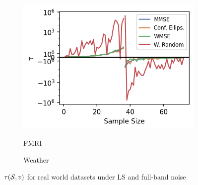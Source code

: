 \begin{figure}
    \centering
    \begin{subfigure}{0.3\columnwidth}
    \resizebox{\width}{0.62\columnwidth}
    {\includegraphics[width=\columnwidth]{figures/proj1/plots/LS_threshold_real/fmri_subsample_500_367_bandwidth_36_thresholds_LS.png}}
    \caption{FMRI} 
    \label{snr_FMRI}
    \end{subfigure}
    \begin{subfigure}{0.3\columnwidth}
    \caption{Weather}%
    \label{snr_Weather}%
    \end{subfigure}
    \caption{$\tau(\mathcal{S},v)$ for real world datasets under LS and full-band noise}
\label{LS_SNR_Threshold_plots_all_real}
\end{figure}

